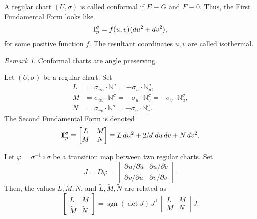 \documentclass[11pt]{article}
\newcommand{\N}{\mathbb{N}}
\newcommand{\I}{{\rm I}}
\newcommand{\II}{{\rm I\!I}}
\DeclareMathOperator{\sgn}{sgn}
\theoremstyle{definition}
\theoremstyle{remark}
\newtheorem*{remark}{Remark}
\numberwithin{equation}{section}
\begin{document}
    
    \begin{definition}
        A regular chart $(U, \sigma)$ is called conformal if $E \equiv G$ and $F
        \equiv 0$. Thus, the First Fundamental Form looks like \[
            \I_p^\sigma = f(u, v)(du^2 + dv^2),
        \] for some positive function $f$. The resultant coordinates $u, v$ are
        called isothermal.
        \begin{remark}
            Conformal charts are angle preserving.
        \end{remark}
    \end{definition}


    \begin{definition}
        Let $(U, \sigma)$ be a regular chart. Set \begin{align*}
            L &= \sigma_{uu}\cdot \N^\sigma = -\sigma_u\cdot \N^\sigma_u, \\
            M &= \sigma_{uv}\cdot \N^\sigma = -\sigma_u\cdot \N^\sigma_v =
            -\sigma_v\cdot \N^\sigma_u, \\
            N &= \sigma_{vv}\cdot \N^\sigma = -\sigma_v\cdot \N^\sigma_v.
        \end{align*}
        The Second Fundamental Form is denoted \[
            \II_p^\sigma \equiv \begin{bmatrix}
                L & M \\ M & N
            \end{bmatrix} \equiv L\,du^2 + 2M\,du\,dv + N\,dv^2.
        \] 
    \end{definition}

    \begin{lemma}
        Let $\varphi = \sigma^{-1}\circ \tilde{\sigma}$ be a transition map between
        two regular charts. Set \[
            J = D\varphi = \begin{bmatrix}
                \partial u / \partial \tilde{u} & \partial u / \partial \tilde{v} \\
                \partial v / \partial \tilde{u} & \partial v / \partial \tilde{v}
            \end{bmatrix}.
        \] Then, the values $L, M, N$, and $\tilde{L}, \tilde{M}, \tilde{N}$ are
        related as \[
            \begin{bmatrix}
                \tilde{L} & \tilde{M} \\ \tilde{M} & \tilde{N}
            \end{bmatrix} = \sgn(\det{J})\,J^\top \begin{bmatrix}
                L & M \\ M & N
            \end{bmatrix} J.
        \] 
    \end{lemma}
\end{document}
